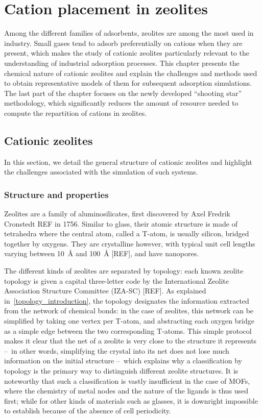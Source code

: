 \documentclass[main.tex]{subfiles}
\begin{document}
\chapter{Cation placement in zeolites}
\vspace*{-1\baselineskip}

Among the different families of adsorbents, zeolites are among the most used in industry. Small gases tend to adsorb preferentially on cations when they are present, which makes the study of cationic zeolites particularly relevant to the understanding of industrial adsorption processes. This chapter presents the chemical nature of cationic zeolites and explain the challenges and methods used to obtain representative models of them for subsequent adsorption simulations. The last part of the chapter focuses on the newly developed ``shooting star'' methodology, which significantly reduces the amount of resource needed to compute the repartition of cations in zeolites.

\section{Cationic zeolites}

In this section, we detail the general structure of cationic zeolites and highlight the challenges associated with the simulation of such systems.

\subsection{Structure and properties}

Zeolites are a family of aluminosilicates, first discovered by Axel Fredrik Cronstedt REF in 1756. Similar to glass, their atomic structure is made of tetrahedra where the central atom, called a T-atom, is usually silicon, bridged together by oxygens. They are crystalline however, with typical unit cell lengths varying between \qty{10}{\angstrom} and \qty{100}{\angstrom} [REF], and have nanopores.

The different kinds of zeolites are separated by topology: each known zeolite topology is given a capital three-letter code by the International Zeolite Association Structure Committee (IZA-SC) [REF]. As explained in~\autoref{topology_introduction}, the topology designates the information extracted from the network of chemical bonds: in the case of zeolites, this network can be simplified by taking one vertex per T-atom, and abstracting each oxygen bridge as a simple edge between the two corresponding T-atoms. This simple protocol makes it clear that the net of a zeolite is very close to the structure it represents --~in other words, simplifying the crystal into its net does not lose much information on the initial structure --~which explains why a classification by topology is the primary way to distinguish different zeolite structures. It is noteworthy that such a classification is vastly insufficient in the case of MOFs, where the chemistry of metal nodes and the nature of the ligands is thus used first; while for other kinds of materials such as glasses, it is downright impossible to establish because of the absence of cell periodicity.
\end{document}
